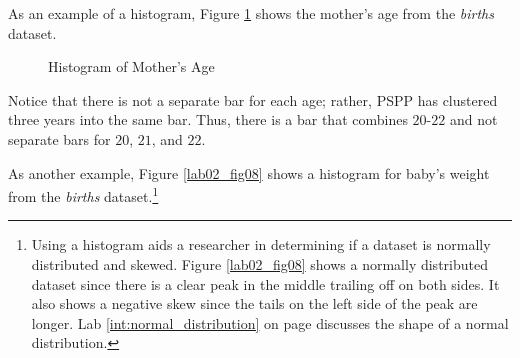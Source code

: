 As an example of a histogram, Figure \ref{lab02_fig07} shows the mother's age from the \textit{births} dataset.

\begin{figure}[H]
  \begin{center}
    \caption{Histogram of Mother's Age}
    \label{lab02_fig07}
  \end{center}
\end{figure}

Notice that there is not a separate bar for each age; rather, \acs{PSPP} has clustered three years into the same bar. Thus, there is a bar that combines $ 20 $-$ 22 $ and not separate bars for $ 20 $, $ 21 $, and $ 22 $.

As another example, Figure \ref{lab02_fig08} shows a histogram for baby's weight from the \textit{births} dataset.\footnote{Using a histogram aids a researcher in determining if a dataset is normally distributed and skewed. Figure \ref{lab02_fig08} shows a normally distributed dataset since there is a clear peak in the middle trailing off on both sides. It also shows a negative skew since the tails on the left side of the peak are longer. Lab \ref{int:normal_distribution} on page \pageref{int:normal_distribution} discusses the shape of a normal distribution.}

